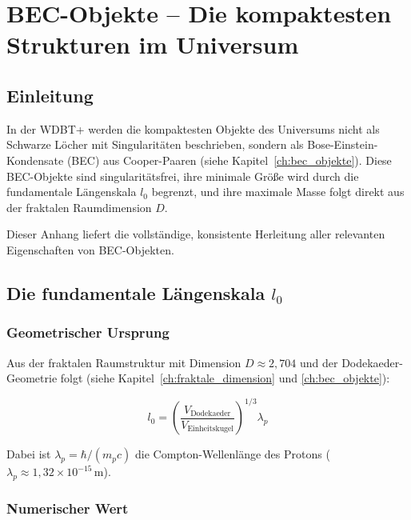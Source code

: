 
\chapter{BEC-Objekte – Die kompaktesten Strukturen im Universum}
\label{app:bec}

\section{Einleitung}
\label{app:bec_einleitung}

In der WDBT+ werden die kompaktesten Objekte des Universums nicht als 
Schwarze Löcher mit Singularitäten beschrieben, sondern als 
Bose-Einstein-Kondensate (BEC) aus Cooper-Paaren (siehe Kapitel~\ref{ch:bec_objekte}). 
Diese BEC-Objekte sind singularitätsfrei, ihre minimale Größe wird durch 
die fundamentale Längenskala \( l_0 \) begrenzt, und ihre maximale Masse 
folgt direkt aus der fraktalen Raumdimension \( D \).

Dieser Anhang liefert die vollständige, konsistente Herleitung aller 
relevanten Eigenschaften von BEC-Objekten.

\section{Die fundamentale Längenskala \( l_0 \)}
\label{app:bec_l0}

\subsection{Geometrischer Ursprung}
\label{sub:bec_l0_ursprung}

Aus der fraktalen Raumstruktur mit Dimension \( D \approx 2,704 \) und der 
Dodekaeder-Geometrie folgt (siehe Kapitel~\ref{ch:fraktale_dimension} und \ref{ch:bec_objekte}):

\[
l_0 = \left( \frac{V_{\text{Dodekaeder}}}{V_{\text{Einheitskugel}}} \right)^{1/3} \lambda_p \tag{K.1}
\]

Dabei ist \( \lambda_p = \hbar / (m_p c) \) die Compton-Wellenlänge des 
Protons (\( \lambda_p \approx 1,32 \times 10^{-15} \, \text{m} \)).

\subsection{Numerischer Wert}
\label{sub:bec_l0_numerisch}


